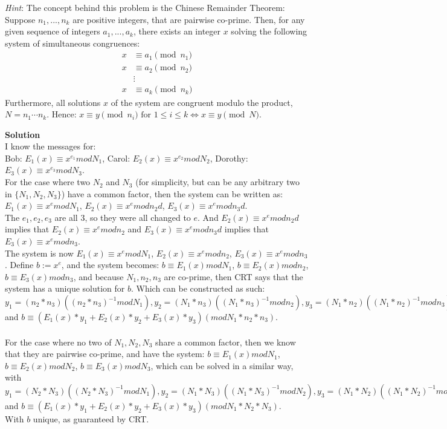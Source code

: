 \documentclass[11pt]{article}
\newenvironment{Parts}{\begin{enumerate}[label=(\alph*)]}{\end{enumerate}}
\begin{document}
\begin{Parts}
        
    \textit{Hint}: The concept behind this problem is the Chinese Remainder Theorem:
    Suppose $n_1, ...,n_k$ are positive integers, that are pairwise co-prime.
    Then, for any given sequence of integers $a_1, ..., a_k$, there exists an
    integer $x$ solving the following system of simultaneous congruences:
        \begin{align*}
            x &\equiv a_1 \pmod{n_1} \\ 
        x &\equiv a_2 \pmod{n_2} \\ 
        &\vdots \\ 
        x &\equiv a_k \pmod{n_k} 
    \end{align*}
    Furthermore, all solutions $x$ of the system are congruent modulo 
    the product, $N=n_1 \dotsm n_k$. Hence:
        $x \equiv y \pmod{n_i} \text{ for } 1 \leq i \leq k \Leftrightarrow 
      x \equiv y \pmod N $.
\begin{mdframed} \textbf{Solution} \\
I know the messages for: \\
Bob: $E_1(x) \equiv x^{e_1}modN_1$, Carol: $E_2(x) \equiv x^{e_2}modN_2$, Dorothy: $E_3(x) \equiv x^{e_3}modN_3$. \\
For the case where two $N_2$ and $N_3$ (for simplicity, but can be any arbitrary two in $\{N_1,N_2,N_3\}$) have a common factor, then the system can be written as: \\
$E_1(x) \equiv x^{e}modN_1$, $E_2(x) \equiv x^{e}modn_2d$, $E_3(x) \equiv x^{e}modn_3d$. \\
The $e_1,e_2,e_3$ are all 3, so they were all changed to $e$. And $E_2(x) \equiv x^{e}modn_2d$ implies that $E_2(x) \equiv x^{e}modn_2$ and $E_3(x) \equiv x^{e}modn_3d$ implies that $E_3(x) \equiv x^{e}modn_3$. \\
The system is now $E_1(x) \equiv x^{e}modN_1$, $E_2(x) \equiv x^{e}modn_2$, $E_3(x) \equiv x^{e}modn_3$. Define $b:=x^e$, and the system becomes: $b \equiv E_1(x)modN_1$, $b \equiv E_2(x)modn_2$, $b \equiv E_3(x)modn_3$, and because $N_1, n_2, n_3$ are co-prime, then CRT says that the system has a unique solution for $b$. Which can be constructed as such: 
$y_1=(n_2*n_3)((n_2*n_3)^{-1}modN_1), y_2=(N_1*n_3)((N_1*n_3)^{-1}modn_2), y_3=(N_1*n_2)((N_1*n_2)^{-1}modn_3)$ and $b \equiv (E_1(x)*y_1+E_2(x)*y_2+E_3(x)*y_3)(mod N_1*n_2*n_3)$. \\ \\
For the case where no two of $N_1,N_2,N_3$ share a common factor, then we know that they are pairwise co-prime, and have the system: $b \equiv E_1(x)modN_1$, $b \equiv E_2(x)modN_2$, $b \equiv E_3(x)modN_3$, which can be solved in a similar way, with $y_1=(N_2*N_3)((N_2*N_3)^{-1}modN_1), y_2=(N_1*N_3)((N_1*N_3)^{-1}modN_2), y_3=(N_1*N_2)((N_1*N_2)^{-1}modN_3)$ and $b \equiv (E_1(x)*y_1+E_2(x)*y_2+E_3(x)*y_3)(mod N_1*N_2*N_3)$. \\ 
With $b$ unique, as guaranteed by CRT. 


\end{mdframed}
\end{Parts}
\end{document}
